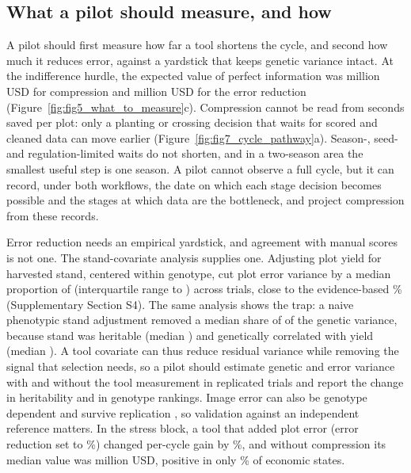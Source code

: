 \subsection{What a pilot should measure, and how}\label{sec:disc_pilot}

A pilot should first measure how far a tool shortens the cycle, and second how much it reduces error, against a yardstick that keeps genetic variance intact. At the indifference hurdle, the expected value of perfect information was \NumEVPPIIndiffCyc million USD for compression and \NumEVPPIIndiffErrRed million USD for the error reduction (Figure~\ref{fig:fig5_what_to_measure}c). Compression cannot be read from seconds saved per plot: only a planting or crossing decision that waits for scored and cleaned data can move earlier (Figure~\ref{fig:fig7_cycle_pathway}a). Season-, seed- and regulation-limited waits do not shorten, and in a two-season area the smallest useful step is one season. A pilot cannot observe a full cycle, but it can record, under both workflows, the date on which each stage decision becomes possible and the stages at which data are the bottleneck, and project compression from these records.

Error reduction needs an empirical yardstick, and agreement with manual scores is not one. The stand-covariate analysis supplies one. Adjusting plot yield for harvested stand, centered within genotype, cut plot error variance by a median proportion of \NumStandDeltaEMed (interquartile range \NumStandDeltaELo to \NumStandDeltaEHi) across \NumStandNtrials trials, close to the evidence-based \NumCfgErrRedCentral\% (Supplementary Section S4). The same analysis shows the trap: a naive phenotypic stand adjustment removed a median share of \NumStandDeltaGNaiveMed of the genetic variance, because stand was heritable (median \NumStandHtwoMed) and genetically correlated with yield (median \NumStandRgMed). A tool covariate can thus reduce residual variance while removing the signal that selection needs, so a pilot should estimate genetic and error variance with and without the tool measurement in replicated trials and report the change in heritability and in genotype rankings. Image error can also be genotype dependent and survive replication \citep{Zhou2021Identification}, so validation against an independent reference matters. In the stress block, a tool that added plot error (error reduction set to \NumCfgStressErr\%) changed per-cycle gain by \NumStressUpliftPct\%, and without compression its median value was \NumStressNPVCycZero million USD, positive in only \NumStressPrPosCycZero\% of economic states.


